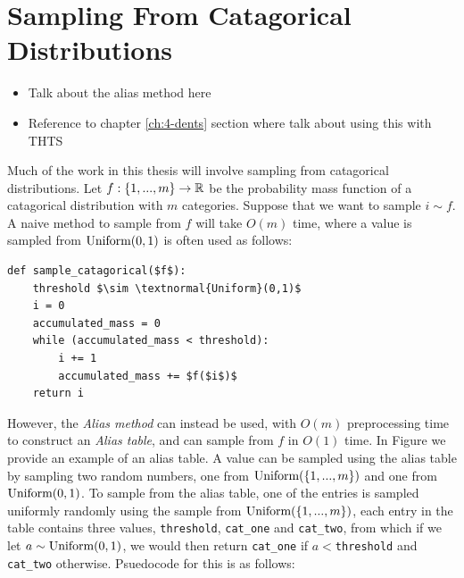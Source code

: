













\section{Sampling From Catagorical Distributions}
\label{sec:2-5-sampling}

    \begin{itemize}
        \item Talk about the alias method here
        \item Reference to chapter \ref{ch:4-dents} section where talk about using this with THTS
    \end{itemize}


    Much of the work in this thesis will involve sampling from catagorical distributions. Let $f:\{1,...,m\}\rightarrow\mathbb{R}$ be the probability mass function of a catagorical distribution with $m$ categories. Suppose that we want to sample $i\sim f$. A naive method to sample from $f$ will take $O(m)$ time, where a value is sampled from $\textnormal{Uniform}(0,1)$ is often used as follows:

    \begin{lstlisting}
def sample_catagorical($f$):
    threshold $\sim \textnormal{Uniform}(0,1)$
    i = 0
    accumulated_mass = 0
    while (accumulated_mass < threshold):
        i += 1
        accumulated_mass += $f($i$)$
    return i
    \end{lstlisting}

    However, the \textit{Alias method}  can instead be used, with $O(m)$ preprocessing time to construct an \textit{Alias table}, and can sample from $f$ in $O(1)$ time. In Figure  we provide an example of an alias table. A value can be sampled using the alias table by sampling two random numbers, one from $\textnormal{Uniform}(\{1,...,m\})$ and one from $\textnormal{Uniform}(0,1)$. To sample from the alias table, one of the entries is sampled uniformly randomly using the sample from $\textnormal{Uniform}(\{1,...,m\})$, each entry in the table contains three values, \texttt{threshold}, \texttt{cat\_one} and \texttt{cat\_two}, from which if we let $a\sim\textnormal{Uniform}(0,1)$, we would then return \texttt{cat\_one} if $a<$\texttt{threshold} and \texttt{cat\_two} otherwise. Psuedocode for this is as follows:

